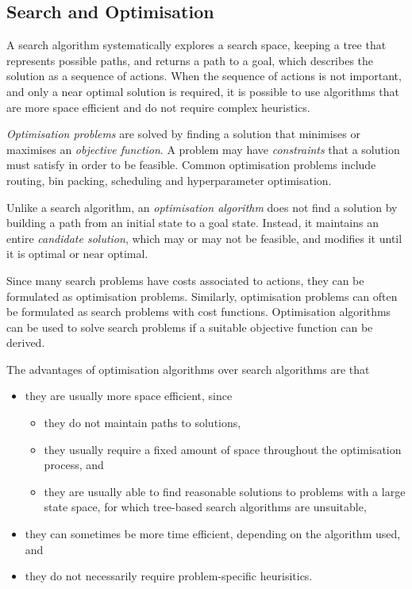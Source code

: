 \subsection{Search and Optimisation}

A search algorithm systematically explores a search space, keeping a tree that represents possible paths, and returns a path to a goal, which describes the solution as a sequence of actions.
When the sequence of actions is not important, and only a near optimal solution is required, it is possible to use algorithms that are more space efficient and do not require complex heuristics.

\emph{Optimisation problems} are solved by finding a solution that minimises or maximises an \emph{objective function}.
A problem may have \emph{constraints} that a solution must satisfy in order to be feasible.
Common optimisation problems include routing, bin packing, scheduling and hyperparameter optimisation.

Unlike a search algorithm, an \emph{optimisation algorithm} does not find a solution by building a path from an initial state to a goal state.
Instead, it maintains an entire \emph{candidate solution}, which may or may not be feasible, and modifies it until it is optimal or near optimal.

Since many search problems have costs associated to actions, they can be formulated as optimisation problems.
Similarly, optimisation problems can often be formulated as search problems with cost functions.
Optimisation algorithms can be used to solve search problems if a suitable objective function can be derived.

The advantages of optimisation algorithms over search algorithms are that
\begin{itemize}
  \item they are usually more space efficient, since
  \begin{itemize}
    \item they do not maintain paths to solutions,
    \item they usually require a fixed amount of space throughout the optimisation process, and
    \item they are usually able to find reasonable solutions to problems with a large state space, for which tree-based search algorithms are unsuitable,
  \end{itemize}
  \item they can sometimes be more time efficient, depending on the algorithm used, and
  \item they do not necessarily require problem-specific heurisitics.
\end{itemize}

